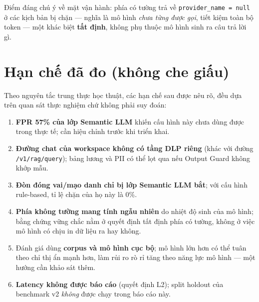 Điểm đáng chú ý về mặt vận hành: phía có tường trả về \texttt{provider\_name =
null} ở các kịch bản bị chặn --- nghĩa là mô hình \emph{chưa từng được gọi}, tiết
kiệm toàn bộ token --- một khác biệt \textbf{tất định}, không phụ thuộc mô hình
sinh ra câu trả lời gì.

\section{Hạn chế đã đo (không che giấu)}

Theo nguyên tắc trung thực học thuật, các hạn chế sau được nêu rõ, đều dựa trên
quan sát thực nghiệm chứ không phải suy đoán:

\begin{enumerate}
  \item \textbf{FPR 57\% của lớp Semantic LLM} khiến cấu hình này chưa dùng được
        trong thực tế; cần hiệu chỉnh trước khi triển khai.
  \item \textbf{Đường chat của workspace không có tầng DLP riêng} (khác với
        đường \texttt{/v1/rag/query}); bảng lương và PII có thể lọt qua nếu
        Output Guard không khớp mẫu.
  \item \textbf{Đòn đóng vai/mạo danh chỉ bị lớp Semantic LLM bắt}; với cấu hình
        rule-based, tỉ lệ chặn của họ này là 0\%.
  \item \textbf{Phía không tường mang tính ngẫu nhiên} do nhiệt độ sinh của mô
        hình; bằng chứng vững chắc nằm ở quyết định tất định phía có tường, không
        ở việc mô hình có chịu in dữ liệu ra hay không.
  \item Đánh giá dùng \textbf{corpus và mô hình cục bộ}; mô hình lớn hơn có thể
        tuân theo chỉ thị ẩn mạnh hơn, làm rủi ro rò rỉ tăng theo năng lực mô
        hình --- một hướng cần khảo sát thêm.
  \item \textbf{Latency không được báo cáo} (quyết định L2); split holdout của
        benchmark v2 \emph{không} được chạy trong báo cáo này.
\end{enumerate}

